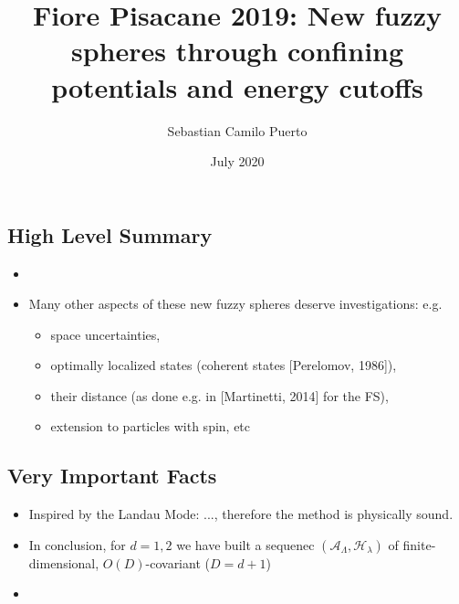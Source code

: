 \documentclass{article}
\title{Fiore Pisacane 2019: New fuzzy spheres through confining potentials and energy cutoffs}
\author{Sebastian Camilo Puerto}
\date{July 2020}
\begin{document}
\maketitle

\tableofcontents

\subsection{High Level Summary}

    \begin{itemize}

    \item {}
    
    \item Many other aspects of these new fuzzy spheres deserve investigations: e.g.
    
        \begin{itemize}
            
        \item space uncertainties,
        
        \item optimally localized states (coherent states [Perelomov, 1986]),
        
        \item their distance (as done e.g. in [Martinetti, 2014] for the FS),
        
        \item extension to particles with spin, etc
            
        \end{itemize}
    
    \end{itemize}

\subsection{Very Important Facts}

    \begin{itemize}

    \item Inspired by the Landau Mode: ..., therefore the method is physically sound.
    
    \item In conclusion, for $d = 1, 2$ we have built a sequenec $(\mathcal A_\Lambda, \mathcal H_\lambda)$ of finite-dimensional, $O(D)$-covariant ($D = d + 1$) 
    
    \item {}
    
    \end{itemize}
\end{document}
